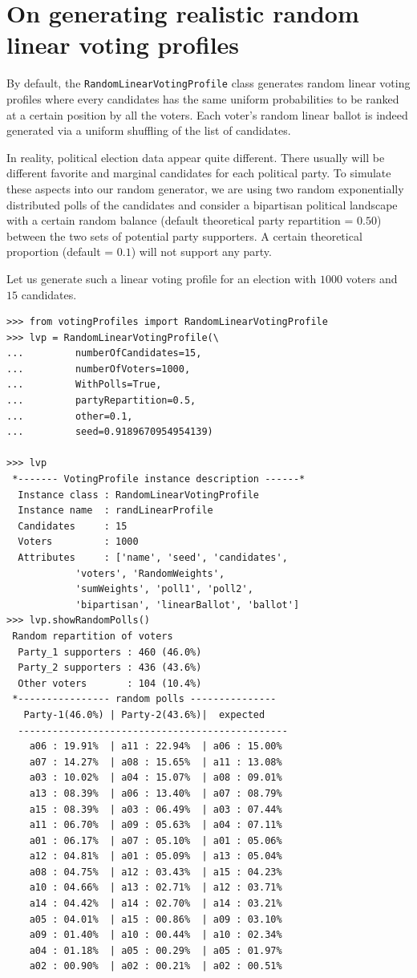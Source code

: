 \section{On generating realistic random linear voting profiles}
\label{sec:7.5}

By default, the \texttt{RandomLinearVotingProfile} class generates random linear voting profiles where every candidates has the same uniform probabilities to be ranked at a certain position by all the voters. Each voter's random linear ballot is indeed generated  via a uniform shuffling of the list of candidates.

In reality, political election data appear quite different. There usually will be different favorite and marginal candidates for each political party. To simulate these aspects into our random generator, we are using two random exponentially distributed polls of the candidates and consider a bipartisan political landscape with a certain random balance (default theoretical party repartition = $0.50$) between the two sets of potential party supporters. A certain theoretical proportion (default = $0.1$) will not support any party.

Let us generate such a linear voting profile for an election with $1000$ voters and $15$ candidates.

\begin{lstlisting}[caption={Generating a linear voting profile with random polls},label=list:7.7,basicstyle=\footnotesize]
>>> from votingProfiles import RandomLinearVotingProfile
>>> lvp = RandomLinearVotingProfile(\
...         numberOfCandidates=15,
...         numberOfVoters=1000,
...         WithPolls=True,
...         partyRepartition=0.5,
...         other=0.1,
...         seed=0.9189670954954139)

>>> lvp
 *------- VotingProfile instance description ------*
  Instance class : RandomLinearVotingProfile
  Instance name  : randLinearProfile
  Candidates     : 15
  Voters         : 1000
  Attributes     : ['name', 'seed', 'candidates',
            'voters', 'RandomWeights',
            'sumWeights', 'poll1', 'poll2',
            'bipartisan', 'linearBallot', 'ballot']
>>> lvp.showRandomPolls()
 Random repartition of voters
  Party_1 supporters : 460 (46.0%)
  Party_2 supporters : 436 (43.6%)
  Other voters       : 104 (10.4%)
 *---------------- random polls ---------------
   Party-1(46.0%) | Party-2(43.6%)|  expected  
  -----------------------------------------------
    a06 : 19.91%  | a11 : 22.94%  | a06 : 15.00%
    a07 : 14.27%  | a08 : 15.65%  | a11 : 13.08%
    a03 : 10.02%  | a04 : 15.07%  | a08 : 09.01%
    a13 : 08.39%  | a06 : 13.40%  | a07 : 08.79%
    a15 : 08.39%  | a03 : 06.49%  | a03 : 07.44%
    a11 : 06.70%  | a09 : 05.63%  | a04 : 07.11%
    a01 : 06.17%  | a07 : 05.10%  | a01 : 05.06%
    a12 : 04.81%  | a01 : 05.09%  | a13 : 05.04%
    a08 : 04.75%  | a12 : 03.43%  | a15 : 04.23%
    a10 : 04.66%  | a13 : 02.71%  | a12 : 03.71%
    a14 : 04.42%  | a14 : 02.70%  | a14 : 03.21%
    a05 : 04.01%  | a15 : 00.86%  | a09 : 03.10%
    a09 : 01.40%  | a10 : 00.44%  | a10 : 02.34%
    a04 : 01.18%  | a05 : 00.29%  | a05 : 01.97%
    a02 : 00.90%  | a02 : 00.21%  | a02 : 00.51%
\end{lstlisting}


